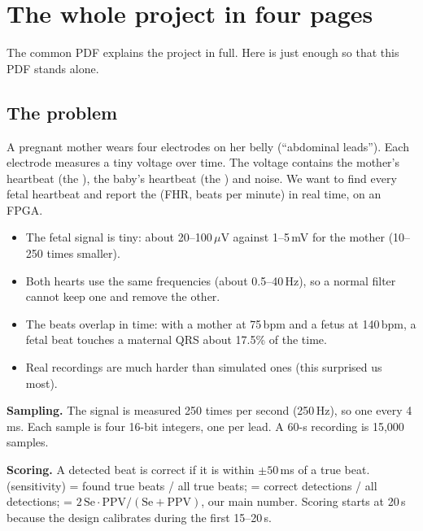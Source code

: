 \documentclass[11pt]{article}
\begin{document}
\section{The whole project in four pages}
The common PDF  explains the project in full. Here is just enough so that this PDF stands alone.

\subsection{The problem}
A pregnant mother wears four electrodes on her belly (``abdominal leads''). Each electrode measures a tiny voltage over time. The voltage contains the mother's heartbeat (the ), the baby's heartbeat (the ) and noise. We want to find every fetal heartbeat and report the  (FHR, beats per minute) in real time, on an FPGA.

\begin{simple}
\begin{itemize}
  \item The fetal signal is tiny: about 20--100\,$\mu$V against 1--5\,mV for the mother (10--250 times smaller).
  \item Both hearts use the same frequencies (about 0.5--40\,Hz), so a normal filter cannot keep one and remove the other.
  \item The beats overlap in time: with a mother at 75\,bpm and a fetus at 140\,bpm, a fetal beat touches a maternal QRS about 17.5\% of the time.
  \item Real recordings are much harder than simulated ones (this surprised us most).
\end{itemize}
\end{simple}

\textbf{Sampling.} The signal is measured 250 times per second (250\,Hz), so one  every 4\,ms. Each sample is four 16-bit integers, one per lead. A 60-s recording is 15,000 samples.

\textbf{Scoring.} A detected beat is correct if it is within $\pm 50$\,ms of a true beat.  (sensitivity) = found true beats / all true beats;  = correct detections / all detections;  = $2\,\text{Se}\cdot\text{PPV}/(\text{Se}+\text{PPV})$, our main number. Scoring starts at 20\,s because the design calibrates during the first 15--20\,s.
\end{document}
